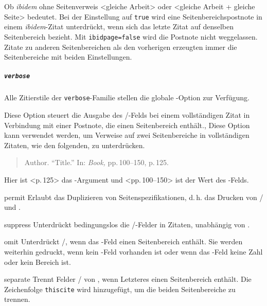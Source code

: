 \documentclass{ltxdockit}[2011/03/25]
\begin{document}
\begin{optionlist}


Ob \emph{ibidem} ohne Seitenverweis <gleiche Arbeit> oder <gleiche Arbeit + 
gleiche Seite> bedeutet. Bei der Einstellung auf \texttt{true} wird eine Seitenbereichspostnote in einem  \emph{ibidem}-Zitat unterdrückt, wenn sich das letzte Zitat auf denselben Seitenbereich bezieht. Mit \texttt{ibidpage=false}
wird die Postnote nicht weggelassen. Zitate zu anderen Seitenbereichen als den vorherigen erzeugten immer die Seitenbereiche mit beiden Einstellungen. 
\end{optionlist}

\subparagraph{\texttt{verbose}} Alle Zitierstile der \texttt{verbose}-Familie stellen die globale -Option zur Verfügung.

\begin{optionlist}


Diese Option steuert die Ausgabe des \slash{}-Felds bei einem vollständigen Zitat in Verbindung mit einer Postnote, die einen Seitenbereich enthält., Diese Option kann verwendet werden, um Verweise auf zwei Seitenbereiche in vollständigen Zitaten, wie den folgenden, zu unterdrücken. 
    
\begin{quote}
Author. \enquote{Title.} In: \emph{Book,} pp.\,100--150, p.\,125.
\end{quote}

Hier ist <p.\,125> das -Argument und <pp.\,100--150> 
ist der Wert des -Felds.

\begin{valuelist}
\item[permit] Erlaubt das Duplizieren von Seitenspezifikationen, d.\,h. das
Drucken von \slash{} und .
\item[suppress] Unterdrückt bedingungslos die \slash {}-Felder in Zitaten, unabhängig von .
\item[omit] Unterdrückt \slash {}, wenn
das -Feld einen Seitenbereich enthält. Sie werden weiterhin gedruckt, wenn kein -Feld vorhanden ist oder wenn das  -Feld keine Zahl oder kein Bereich ist. 
\item[separate] Trennt Felder \slash {} von  , wenn Letzteres einen Seitenbereich enthält. Die Zeichenfolge \texttt{thiscite}  wird hinzugefügt, um die beiden Seitenbereiche zu trennen. 
\end{valuelist}

\end{optionlist}
\end{document}
